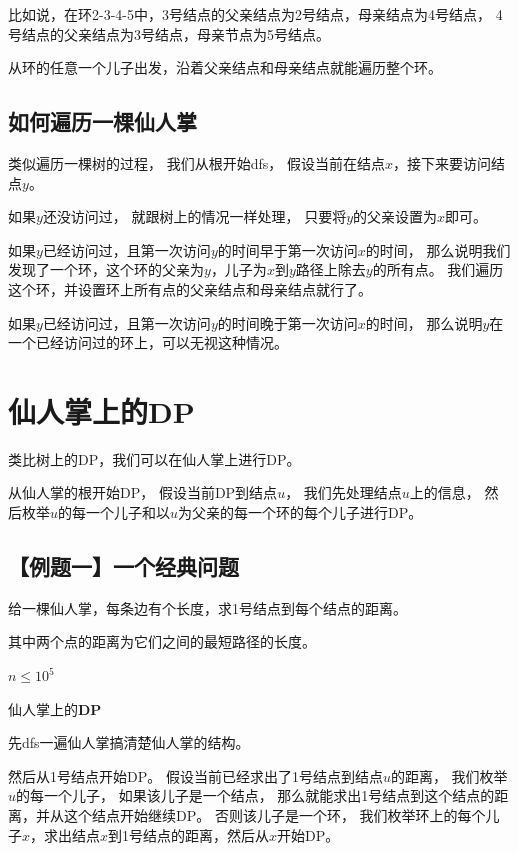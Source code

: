 \documentclass{noithesis}
\begin{document}
比如说，在环2-3-4-5中，3号结点的父亲结点为2号结点，母亲结点为4号结点，
4号结点的父亲结点为3号结点，母亲节点为5号结点。

从环的任意一个儿子出发，沿着父亲结点和母亲结点就能遍历整个环。


\subsection{如何遍历一棵仙人掌}

类似遍历一棵树的过程，
我们从根开始dfs，
假设当前在结点$x$，接下来要访问结点$y$。

如果$y$还没访问过，
就跟树上的情况一样处理，
只要将$y$的父亲设置为$x$即可。

如果$y$已经访问过，且第一次访问$y$的时间早于第一次访问$x$的时间，
那么说明我们发现了一个环，这个环的父亲为$y$，儿子为$x$到$y$路径上除去$y$的所有点。
我们遍历这个环，并设置环上所有点的父亲结点和母亲结点就行了。

如果$y$已经访问过，且第一次访问$y$的时间晚于第一次访问$x$的时间，
那么说明$y$在一个已经访问过的环上，可以无视这种情况。




\section{仙人掌上的DP}

类比树上的DP，我们可以在仙人掌上进行DP。

从仙人掌的根开始DP，
假设当前DP到结点$u$，
我们先处理结点$u$上的信息，
然后枚举$u$的每一个儿子和以$u$为父亲的每一个环的每个儿子进行DP。

\text{}

\subsection{【例题一】一个经典问题}

给一棵仙人掌，每条边有个长度，求1号结点到每个结点的距离。

其中两个点的距离为它们之间的最短路径的长度。

$n \le 10^5$

\text{}

$\textbf{仙人掌上的DP}$

先dfs一遍仙人掌搞清楚仙人掌的结构。

然后从1号结点开始DP。
假设当前已经求出了1号结点到结点$u$的距离，
我们枚举$u$的每一个儿子，
如果该儿子是一个结点，
那么就能求出1号结点到这个结点的距离，并从这个结点开始继续DP。
否则该儿子是一个环，
我们枚举环上的每个儿子$x$，求出结点$x$到1号结点的距离，然后从$x$开始DP。
\end{document}
